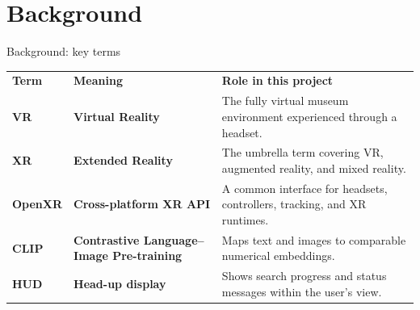 \section{Background}
\begin{frame}[c]{Background: key terms}
\centering
\small
\renewcommand{\arraystretch}{1.28}
\setlength{\tabcolsep}{0.22cm}

\begin{tabular}{
  @{}
  >{\raggedright\arraybackslash}p{1.55cm}
  >{\raggedright\arraybackslash}p{3.70cm}
  >{\raggedright\arraybackslash}p{6.65cm}
  @{}
}
  \rowcolor{unilightmint}
  \textbf{Term} &
  \textbf{Meaning} &
  \textbf{Role in this project} \\

  \textcolor{unired}{\textbf{VR}} &
  \textbf{Virtual Reality} &
  The fully virtual museum environment experienced through a headset. \\

  \rowcolor{softgrey}
  \textcolor{unired}{\textbf{XR}} &
  \textbf{Extended Reality} &
  The umbrella term covering VR, augmented reality, and mixed reality. \\

  \textcolor{unired}{\textbf{OpenXR}} &
  \textbf{Cross-platform XR API} &
  A common interface for headsets, controllers, tracking, and XR runtimes. \\

  \rowcolor{softgrey}
  \textcolor{unired}{\textbf{CLIP}} &
  \textbf{Contrastive Language--Image Pre-training} &
  Maps text and images to comparable numerical embeddings. \\

  \textcolor{unired}{\textbf{HUD}} &
  \textbf{Head-up display} &
  Shows search progress and status messages within the user's view. \\
\end{tabular}

\end{frame}
